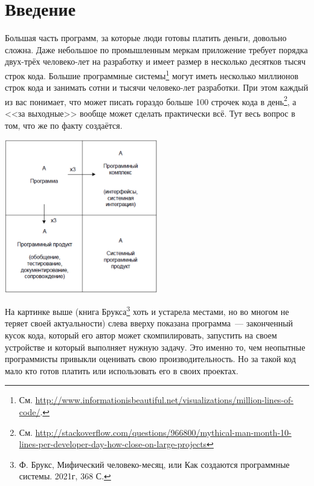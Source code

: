 \documentclass{../../text-style}
\begin{document}
\maketitle
\thispagestyle{empty}


\section{Введение}

Большая часть программ, за которые люди готовы платить деньги, довольно сложна. Даже небольшое по промышленным меркам приложение требует порядка двух-трёх человеко-лет на разработку и имеет размер в несколько десятков тысяч строк кода. Большие программные системы\footnote{См. \url{http://www.informationisbeautiful.net/visualizations/million-lines-of-code/}.} могут иметь несколько миллионов строк кода и занимать сотни и тысячи человеко-лет разработки. При этом каждый из вас понимает, что может писать гораздо больше 100 строчек кода в день\footnote{См. \url{http://stackoverflow.com/questions/966800/mythical-man-month-10-lines-per-developer-day-how-close-on-large-projects}}, а <<за выходные>> вообще может сделать практически всё. Тут весь вопрос в том, что же по факту создаётся.

\begin{center}
    \includegraphics[width=0.5\textwidth]{brooksSquare.png}
\end{center}

На картинке выше (книга Брукса\footnote{Ф. Брукс, Мифический человеко-месяц, или Как создаются программные системы. 2021г, 368 С.} хоть и устарела местами, но во многом не теряет своей актуальности) слева вверху показана программа~--- законченный кусок кода, который его автор может скомпилировать, запустить на своем устройстве и который выполняет нужную задачу. Это именно то, чем неопытные программисты привыкли оценивать свою производительность. Но за такой код мало кто готов платить или использовать его в своих проектах.
\end{document}
